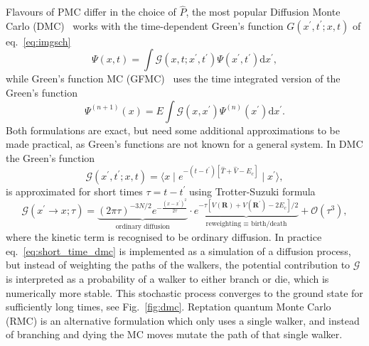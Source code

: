 Flavours of PMC differ in the choice of $\hat{P}$, the most popular Diffusion Monte Carlo (DMC)~\cite{foulkes2001quantum, reynolds1990diffusion} works with the time-dependent Green's function $G(x^\prime, t^\prime; x, t)$ of eq.~\eqref{eq:imgsch}
\begin{equation}
	\Psi(x, t)=\int \mathcal G\left(x, t; x^\prime, t^\prime\right) \Psi \left(x^{\prime}, t^\prime \right) \mathrm{d} x^{\prime},
\end{equation}
while Green's function MC (GFMC)~\cite{kalos1962monte, kalos1966stochastic} uses the time integrated version of the Green's function
\begin{equation}
	\Psi^{(n+1)}(x)=E \int \mathcal G\left(x, x^{\prime}\right) \Psi^{(n)}\left(x^{\prime}\right) \mathrm{d}x^\prime. 
\end{equation}
Both formulations are exact, but need some additional approximations to be made practical, as Green's functions are not known for a general system. In DMC the Green's function
\begin{equation}
	\mathcal G(x^\prime, t^\prime; x, t) = \langle x \mid e^{-(t-t^\prime) [\hat T + \hat V - E_c ] } \mid x^\prime \rangle,
\end{equation}
is approximated for short times $\tau = t-t^\prime$ using Trotter-Suzuki formula
\begin{equation}
	\label{eq:short_time_dmc}
	\mathcal G(x^\prime \rightarrow x; \tau) = \underbrace{(2 \pi \tau)^{-3N / 2} e^{-\frac{\left(x-x^{\prime}\right)^{2}}{2 \tau}}}_{\text{ordinary diffusion}} \cdot \underbrace{e^{-\tau\left[V(\mathbf{R})+V\left(\mathbf{R}^{\prime}\right)-2 E_{c}\right] / 2}}_{\text{reweighting $\equiv$ birth/death}} + \mathcal{O}(\tau^3),
\end{equation}
where the kinetic term is recognised to be ordinary diffusion. In practice eq.~\eqref{eq:short_time_dmc} is implemented as a simulation of a diffusion process, but instead of weighting the paths of the walkers, the potential contribution to $\mathcal G$ is interpreted as a probability of a walker to either branch or die, which is numerically more stable. This stochastic process converges to the ground state for sufficiently long times, see Fig.~\ref{fig:dmc}. Reptation quantum Monte Carlo~\cite{reynolds1990diffusion} (RMC) is an alternative formulation which only uses a single walker, and instead of branching and dying the MC moves mutate the path of that single walker. 
